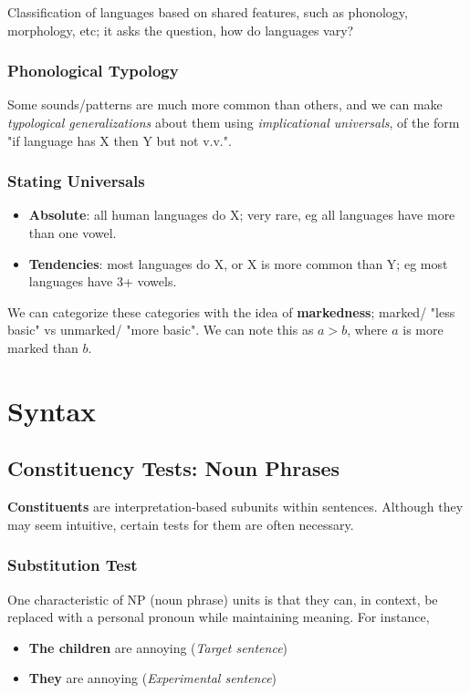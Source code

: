 \documentclass[12pt]{article}
\begin{document}
Classification of languages based on shared features, such as phonology, morphology, etc; it asks the question, how do languages vary?

\subsubsection{Phonological Typology}

Some sounds/patterns are much more common than others, and we can make \textit{typological generalizations} about them using \textit{implicational universals}, of the form "if language has X then Y but not v.v.". 

\subsubsection{Stating Universals}

\begin{itemize}
  \item \textbf{Absolute}: all human languages do X; very rare, eg all languages have more than one vowel.
  \item \textbf{Tendencies}: most languages do X, or X is more common than Y; eg most languages have 3+ vowels.
\end{itemize}

We can categorize these categories with the idea of \textbf{markedness}; marked/ "less basic" vs unmarked/ "more basic". We can note this as $a > b$, where $a$ is more marked than $b$.

\section{Syntax}
\subsection{Constituency Tests: Noun Phrases}

\textbf{Constituents} are interpretation-based subunits within sentences. Although they may seem intuitive, certain tests for them are often necessary.

\subsubsection{Substitution Test}

One characteristic of NP (noun phrase) units is that they can, in context, be replaced with a personal pronoun while maintaining meaning. For instance,
\begin{itemize}
  \item \textbf{The children} are annoying (\textit{Target sentence})
  \item \textbf{They} are annoying (\textit{Experimental sentence})
\end{itemize}
\end{document}
